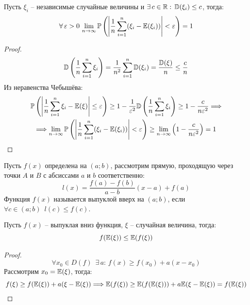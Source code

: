 \documentclass[12pt]{article}
\begin{document}
\begin{theorem}
    Пусть $\xi_i$ -- независимые случайные величины и $\exists\,c\in\mathbb{R}:\,\mathbb{D}(\xi_i)\leq c$, тогда:
    $$\forall\,\varepsilon>0\, \lim_{n\to\infty}\mathbb{P}\left(\left|\frac{1}{n}\sum_{i=1}^{n}(\xi_i-\mathbb{E}(\xi_i))\right|<\varepsilon\right)=1$$
\end{theorem}
\begin{proof}
    $$\mathbb{D}\left(\frac{1}{n}\sum_{i=1}^{n}\xi_i\right)=\frac{1}{n^2}\sum_{i=1}^{n}\mathbb{D}(\xi_i)=\frac{\mathbb{D}(\xi)}{n}\leq\frac{c}{n}$$
    Из неравенства Чебышёва:
    \begin{multline*}
        \mathbb{P}\left(\left|\frac{1}{n}\sum_{i=1}^{n}\xi_i-\mathbb{E}(\xi)\right|\leq\varepsilon\right)\geq1-\frac{1}{\varepsilon^2}\mathbb{D}\left(\frac{1}{n}\sum_{i=1}^{n}\xi_i\right)\geq1-\frac{c}{n\varepsilon^2}\Longrightarrow\\
        \Longrightarrow\lim_{n\to\infty}\mathbb{P}\left(\left|\frac{1}{n}\sum_{i=1}^{n}(\xi_i-\mathbb{E}(\xi_i))\right|<\varepsilon\right)\geq\lim_{n\to\infty}\left(1-\frac{c}{n\varepsilon^2}\right)=1
    \end{multline*}
\end{proof}
\begin{definition}
    Пусть $f(x)$ определена на $(a;b)$, рассмотрим прямую, проходящую через точки $A$ и $B$ с абсиссами $a$ и $b$ соответственно: 
    $$l(x)=\frac{f(a)-f(b)}{a-b}(x-a)+f(a)$$
    Функция $f(x)$ называется выпуклой вверх на $(a;b)$, если $\forall c\in(a;b)\enspace l(c)\leq f(c)$.
\end{definition}
\begin{theorem}
    Пусть $f(x)$ -- выпуклая вниз функция, $\xi$ -- случайная величина, тогда:
    $$f(\mathbb{E}(\xi))\leq \mathbb{E}(f(\xi))$$
\end{theorem}
\begin{proof}
    $$\forall x_0\in D(f)\enspace \exists\,a:\,f(x)\geq f(x_0)+a(x-x_0)$$
    Рассмотрим $x_0=\mathbb{E}(\xi)$, тогда:
    $$f(\xi)\geq f(\mathbb{E}(\xi))+a(\xi-\mathbb{E}(\xi))\Longrightarrow \mathbb{E}(f(\xi))\geq \mathbb{E}(f(\mathbb{E}(\xi)))+a\mathbb{E}(\xi-\mathbb{E}(\xi))=f(\mathbb{E}(\xi))$$
\end{proof}
\end{document}

